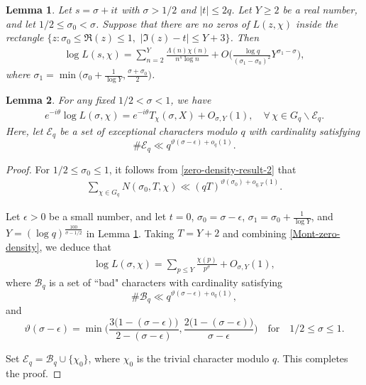 \documentclass[10pt,a4paper]{amsart}
\newtheorem{lem}{Lemma}
\begin{document}
\begin{lem}\label{sound-Truncated}
Let $s=\sigma+it$ with $\sigma>1/2$ and $|t|\leq 2q$. Let $Y\geq2$ be a real number, and let $1/2\leq\sigma_0<\sigma$. Suppose that there are no zeros of $L(z,\chi)$ inside the rectangle $\{z:\sigma_0\leq\Re(z)\leq1,\,\,|\Im(z)-t|\leq Y+3\}$. Then
\begin{equation*}
\begin{aligned}
\log L(s,\chi)=\sum_{n=2}^{Y}\frac{\Lambda(n)\chi(n)}{n^{s}\log n}
+O\Big(\frac{\log q}{(\sigma_1-\sigma_0)^2}Y^{\sigma_1-\sigma}\Big),
\end{aligned}
\end{equation*}
where $\sigma_1=\min\big(\sigma_0+\frac{1}{\log Y},\frac{\sigma+\sigma_0}{2}\big)$.
\end{lem}

\begin{lem}\label{truncated-log-Dirichlet}
For any fixed $1/2<\sigma<1$, we have
\begin{equation*}
\begin{aligned}
e^{-i\theta}\log L(\sigma,\chi)=e^{-i\theta}T_{\chi}(\sigma,X)+O_{\sigma,Y}(1),\quad\forall\,\chi\in G_q\backslash \mathcal{E}_{q}.
\end{aligned}
\end{equation*}
Here, let $\mathcal{E}_{q}$ be a set of exceptional characters modulo $q$ with cardinality satisfying
\[
\#\mathcal{E}_{q}\ll q^{\vartheta(\sigma-\epsilon)+o_q(1)}.
\]
\end{lem}

\begin{proof}
For $1/2\leq\sigma_0\leq1$, it follows from \eqref{zero-density-result-2} that
\begin{equation}\label{Mont-zero-density}
\begin{aligned}
\sum_{\chi\in G_q}N(\sigma_0,T,\chi)\ll (qT)^{\vartheta(\sigma_0)+o_{q,T}(1)}.
\end{aligned}
\end{equation}


Let $\epsilon>0$ be a small number, and let $t=0$, $\sigma_0=\sigma-\epsilon$, $\sigma_1=\sigma_0+\frac{1}{\log Y}$, and $Y=(\log q)^{\frac{100}{\sigma-1/2}}$ in Lemma \ref{sound-Truncated}. Taking $T=Y+2$ and combining \eqref{Mont-zero-density}, we deduce that
\begin{equation*}
\begin{aligned}
\log L(\sigma,\chi)=\sum_{p\leq Y}\frac{\chi(p)}{p^{\sigma}}+O_{\sigma,Y}(1),
\end{aligned}
\end{equation*}
where $\mathcal{B}_{q}$ is a set of ``bad" characters with cardinality satisfying
\[
\#\mathcal{B}_{q}\ll q^{\vartheta(\sigma-\epsilon)+o_q(1)},
\]
and
\[
\vartheta(\sigma-\epsilon)=\min\bigg(\frac{3\big(1-(\sigma-\epsilon)\big)}{2-(\sigma-\epsilon)},\frac{2\big(1-(\sigma-\epsilon)\big)}{\sigma-\epsilon}\bigg)
\quad\text{for}\quad 1/2\leq\sigma\leq1.
\]

Set $\mathcal{E}_{q}=\mathcal{B}_{q}\cup\{\chi_0\}$, where $\chi_0$ is the trivial character modulo $q$. This completes the proof.
\end{proof}
\end{document}
